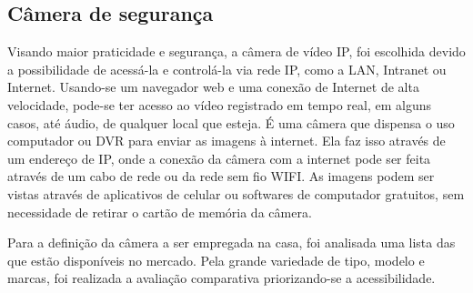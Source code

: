 \subsection{Câmera de segurança}
\par Visando maior praticidade e segurança, a câmera de vídeo IP, foi escolhida devido a possibilidade de acessá-la e controlá-la via rede IP, como a LAN, Intranet ou Internet. Usando-se um navegador web e uma conexão de Internet de alta velocidade, pode-se ter acesso ao vídeo registrado em tempo real, em alguns casos, até áudio, de qualquer local que esteja. É uma câmera que dispensa o uso computador ou DVR para enviar as imagens à internet. Ela faz isso através de um endereço de IP, onde a conexão da câmera com a internet pode ser feita através de um cabo de rede ou da rede sem fio WIFI. As imagens podem ser vistas através de aplicativos de celular ou softwares de computador gratuitos, sem necessidade de retirar o cartão de memória da câmera.
\par Para a definição da câmera a ser empregada na casa, foi analisada uma lista das que estão disponíveis no mercado. Pela grande variedade de tipo, modelo e marcas, foi realizada a avaliação comparativa priorizando-se a acessibilidade.

